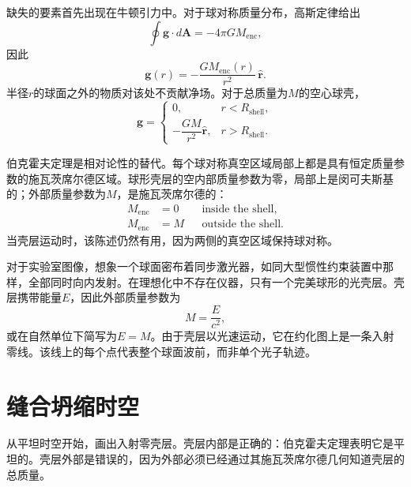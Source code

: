 缺失的要素首先出现在牛顿引力中。对于球对称质量分布，高斯定律给出
\begin{equation}
\oint\mathbf g\cdot d\mathbf A=-4\pi G M_{\mathrm{enc}},
\end{equation}
因此
\begin{equation}
\mathbf g(r)=-\frac{G M_{\mathrm{enc}}(r)}{r^2}\,\hat{\mathbf r}.
\label{eq:l05-shell-theorem}
\end{equation}
半径\(r\)的球面之外的物质对该处不贡献净场。对于总质量为\(M\)的空心球壳，
\begin{equation}
\mathbf g=
\begin{cases}
0, & r<R_{\mathrm{shell}},\\[3pt]
-\dfrac{GM}{r^2}\hat{\mathbf r}, & r>R_{\mathrm{shell}}.
\end{cases}
\end{equation}

伯克霍夫定理是相对论性的替代。每个球对称真空区域局部上都是具有恒定质量参数的施瓦茨席尔德区域。球形壳层的空内部质量参数为零，局部上是闵可夫斯基的；外部质量参数为\(M\)，是施瓦茨席尔德的：
\begin{equation}
\begin{aligned}
M_{\mathrm{enc}}&=0 && \text{inside the shell},\\
M_{\mathrm{enc}}&=M && \text{outside the shell}.
\end{aligned}
\label{eq:l05-birkhoff}
\end{equation}
当壳层运动时，该陈述仍然有用，因为两侧的真空区域保持球对称。


对于实验室图像，想象一个球面密布着同步激光器，如同大型惯性约束装置中那样，全部同时向内发射。在理想化中不存在仪器，只有一个完美球形的光壳层。壳层携带能量\(E\)，因此外部质量参数为
\begin{equation}
M=\frac{E}{c^2},
\end{equation}
或在自然单位下简写为\(E=M\)。由于壳层以光速运动，它在约化图上是一条入射零线。该线上的每个点代表整个球面波前，而非单个光子轨迹。

\section{缝合坍缩时空}

从平坦时空开始，画出入射零壳层。壳层内部是正确的：伯克霍夫定理表明它是平坦的。壳层外部是错误的，因为外部必须已经通过其施瓦茨席尔德几何知道壳层的总质量。

